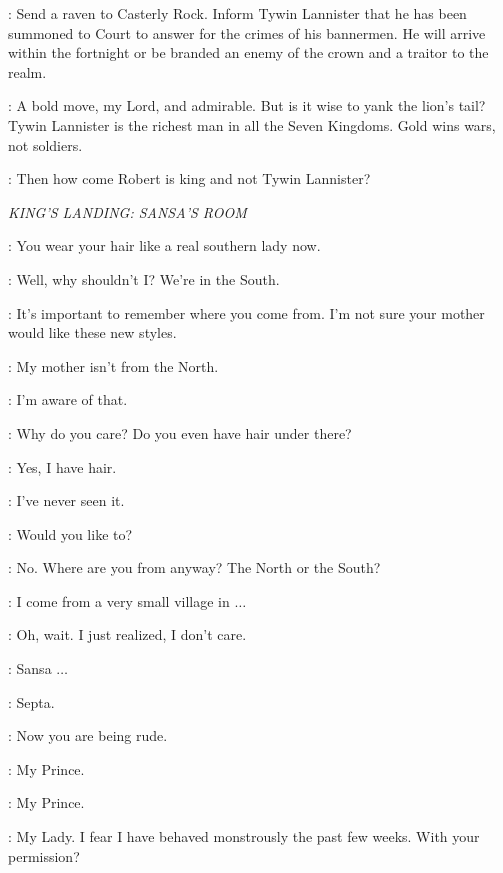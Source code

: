\NED: Send a raven to Casterly Rock. Inform Tywin Lannister that he has been summoned to Court to answer for the crimes of his bannermen. He will arrive within the fortnight or be branded an enemy of the crown and a traitor to the realm. 


\LITTLEFINGER: A bold move, my Lord, and admirable. But is it wise to yank the lion's tail? Tywin Lannister is the richest man in all the Seven Kingdoms. Gold wins wars, not soldiers.

\NED: Then how come Robert is king and not Tywin Lannister? 


\scene

\textit{KING'S LANDING: SANSA'S ROOM} 


\SEPTAMORDANE: You wear your hair like a real southern lady now. 

\SANSA: Well, why shouldn't I? We're in the South. 

\SEPTAMORDANE: It's important to remember where you come from. I'm not sure your mother would like these new styles. 

\SANSA: My mother isn't from the North. 

\SEPTAMORDANE: I'm aware of that. 

\SANSA: Why do you care? Do you even have hair under there? 

\SEPTAMORDANE: Yes, I have hair. 

\SANSA: I've never seen it. 

\SEPTAMORDANE: Would you like to? 

\SANSA: No. Where are you from anyway? The North or the South? 

\SEPTAMORDANE: I come from a very small village in $\ldots$ 

\SANSA: Oh, wait. I just realized, I don't care. 

\SEPTAMORDANE: Sansa $\ldots$ 

\SANSA: Septa. 

\SEPTAMORDANE: Now you are being rude.


\SEPTAMORDANE: My Prince. 

\SANSA: My Prince. 

\JOFFREY: My Lady. I fear I have behaved monstrously the past few weeks.  With your permission?


